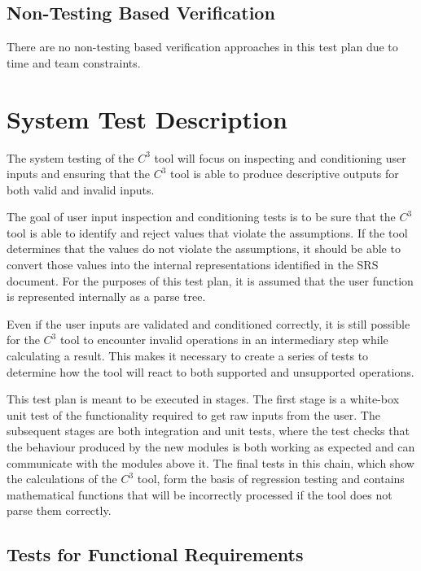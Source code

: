 \documentclass[12pt, titlepage]{article}
\newcommand{\prognameAbbrv}{$C^{3}$}
\begin{document}
\subsection{Non-Testing Based Verification}

There are no non-testing based verification approaches in this test plan due to 
time and team constraints.

\section{System Test Description}
The system testing of the \prognameAbbrv{} tool will focus on inspecting and 
conditioning user inputs and ensuring that the \prognameAbbrv{} tool is able to 
produce descriptive outputs for both valid and invalid inputs. 

The goal of user input inspection and conditioning tests is to be sure that the 
\prognameAbbrv{} tool is able to identify and reject values that violate the 
assumptions. If the tool determines that the values do not violate the 
assumptions, it should be able to convert those values into the internal 
representations identified in the SRS document. For the purposes of this test 
plan, it is assumed that the user function is represented internally as 
a parse tree.

Even if the user inputs are validated and conditioned correctly, it is still 
possible for the \prognameAbbrv{} tool to encounter invalid operations in an 
intermediary step while calculating a result. This makes it necessary to create 
a series of tests to determine how the tool will react to both supported and 
unsupported operations.

This test plan is meant to be executed in stages. The first stage is a 
white-box unit test of the functionality required to get raw inputs from the 
user. The subsequent stages are both integration and unit tests, where the test 
checks that the behaviour produced by the new modules is both working as 
expected and can communicate with the modules above it. The final tests in this 
chain, which show the calculations of the \prognameAbbrv{} tool, form the basis 
of regression testing and contains mathematical functions that will be 
incorrectly processed if the tool does not parse them correctly.
	
\subsection{Tests for Functional Requirements}
\label{testplan_functional}
\end{document}
